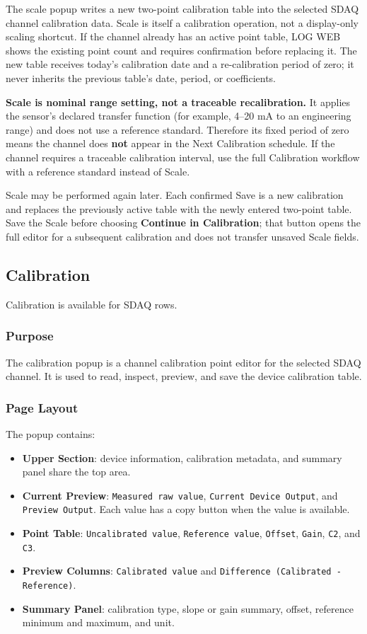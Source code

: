 \documentclass[11pt,a4paper]{article}
\begin{document}
The scale popup writes a new two-point calibration table into the selected SDAQ channel calibration data. Scale is itself a calibration operation, not a display-only scaling shortcut. If the channel already has an active point table, LOG WEB shows the existing point count and requires confirmation before replacing it. The new table receives today's calibration date and a re-calibration period of zero; it never inherits the previous table's date, period, or coefficients.

\textbf{Scale is nominal range setting, not a traceable recalibration.} It applies the sensor's declared transfer function (for example, 4--20 mA to an engineering range) and does not use a reference standard. Therefore its fixed period of zero means the channel does \textbf{not} appear in the Next Calibration schedule. If the channel requires a traceable calibration interval, use the full Calibration workflow with a reference standard instead of Scale.

Scale may be performed again later. Each confirmed Save is a new calibration and replaces the previously active table with the newly entered two-point table. Save the Scale before choosing \textbf{Continue in Calibration}; that button opens the full editor for a subsequent calibration and does not transfer unsaved Scale fields.

\subsection{Calibration}
Calibration is available for SDAQ rows.

\subsubsection{Purpose}
The calibration popup is a channel calibration point editor for the selected SDAQ channel. It is used to read, inspect, preview, and save the device calibration table.

\subsubsection{Page Layout}
The popup contains:

\begin{itemize}
\item \textbf{Upper Section}: device information, calibration metadata, and summary panel share the top area.
\item \textbf{Current Preview}: \texttt{Measured raw value}, \texttt{Current Device Output}, and \texttt{Preview Output}. Each value has a copy button when the value is available.
\item \textbf{Point Table}: \texttt{Uncalibrated value}, \texttt{Reference value}, \texttt{Offset}, \texttt{Gain}, \texttt{C2}, and \texttt{C3}.
\item \textbf{Preview Columns}: \texttt{Calibrated value} and \texttt{Difference (Calibrated - Reference)}.
\item \textbf{Summary Panel}: calibration type, slope or gain summary, offset, reference minimum and maximum, and unit.
\end{itemize}
\end{document}
